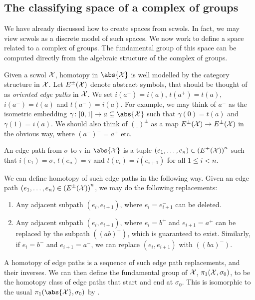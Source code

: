 \subsection{The classifying space of a complex of groups}
We have already discussed how to create spaces from scwols.
In fact, we may view scwols as a discrete model of such spaces.
We now work to define a space related to a complex of groups.
The fundamental group of this space can be computed directly from the algebraic structure of the complex of groups.

Given a scwol $\mathcal{X}$, homotopy in $\abs{\calx}$ is well modelled by the category structure in $\mathcal{X}$.
Let  $E^{\pm}(\mathcal{X})$ denote abstract symbols, that should be thought of as \emph{oriented edge paths} in $\mathcal{X}$.
We set $i(a^+) = i(a)$, $t(a^+) = t(a)$, $i(a^-) = t(a)$ and $t(a^-)= i(a)$.
For example, we may think of $a^-$ as the isometric embedding $\gamma \colon [0,1] \to a \subseteq \abs{\calx}$ such that  $\gamma(0) = t(a)$ and $\gamma(1) = i(a)$.
We should also think of $(\_)^\pm$ as a map $E^\pm(\mathcal{X}) \to E^\pm(\mathcal{X})$ in the obvious way, where  $(a^-)^-= a^+$ etc.
\begin{definition}
	An edge path from $\sigma$ to  $\tau$ in $\abs{\calx}$ is a tuple $(e_1, \ldots, e_n) \in \left(E^\pm(\mathcal{X})\right)^n$ such that $i(e_1)=\sigma$,  $t(e_n)=\tau$ and  $t(e_i) = i(e_{i+1})$ for all  $1 \leq i < n$.
	\label{def:edge_path_in_scwol}
\end{definition}
We can define homotopy of such edge paths in the following way.
Given an edge path $(e_1, \ldots, e_n) \in \left(E^\pm(\mathcal{X})\right)^n$, we may do the following replacements:
\begin{enumerate}
	\item Any adjacent subpath $(e_i,e_{i+1})$, where $e_i=e_{i+1}^-$ can be deleted.
	\item Any adjacent subpath $(e_i,e_{i+1})$, where $e_i = b^+$ and  $e_{i+1}=a^+$ can be replaced by the subpath $((ab)^+)$, which is guaranteed to exist. 
	      Similarly, if $e_i = b^-$ and  $e_{i+1}=a^-$, we can replace $(e_i,e_{i+1})$ with  $((ba)^-)$.
\end{enumerate}
A homotopy of edge paths is a sequence of such edge path replacements, and their inverses.
We can then define the fundamental group of $\mathcal{X}$,  $\pi_1(\mathcal{X},\sigma_0)$, to be the homotopy class of edge paths that start and end at  $\sigma_0$.
This is isomorphic to the usual $\pi_1(\abs{\calx}, \sigma_0)$ by \cite[Corollary 4.12]{hatcher_algebraic_2001}.

